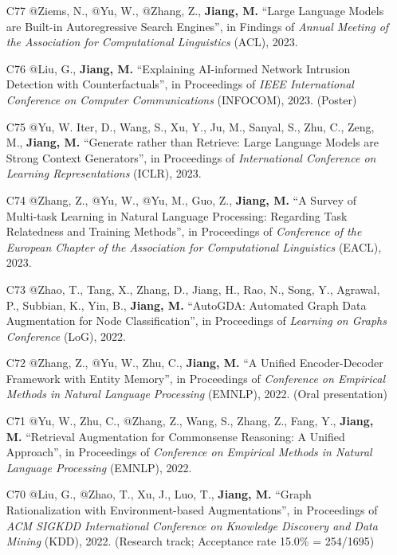 \documentclass[10pt]{article}
\newenvironment{myindentpar}[1]%
{\begin{list}{}%
         {\setlength{\leftmargin}{#1}}%
         \item[]%
}
{\end{list}}
\newcounter{list}
\begin{document}
\begin{myindentpar}{0.00cm}
\begin{enumerate}[leftmargin=.5cm]
\item[C77] @Ziems, N., @Yu, W., @Zhang, Z., \textbf{Jiang, M.} ``Large Language Models are Built-in Autoregressive Search Engines'', in Findings of \textit{Annual Meeting of the Association for Computational Linguistics} (ACL), 2023.

\item[C76] @Liu, G., \textbf{Jiang, M.} ``Explaining AI-informed Network Intrusion Detection with Counterfactuals'', in Proceedings of \textit{IEEE International Conference on Computer Communications} (INFOCOM), 2023. (Poster)
		
\item[C75] @Yu, W. Iter, D., Wang, S., Xu, Y., Ju, M., Sanyal, S., Zhu, C., Zeng, M., \textbf{Jiang, M.} ``Generate rather than Retrieve: Large Language Models are Strong Context Generators'', in Proceedings of \textit{International Conference on Learning Representations} (ICLR), 2023.

\item[C74] @Zhang, Z., @Yu, W., @Yu, M., Guo, Z., \textbf{Jiang, M.} ``A Survey of Multi-task Learning in Natural Language Processing: Regarding Task Relatedness and Training Methods'', in Proceedings of \textit{Conference of the European Chapter of the Association for Computational Linguistics} (EACL), 2023.

\item[C73] @Zhao, T., Tang, X., Zhang, D., Jiang, H., Rao, N., Song, Y., Agrawal, P., Subbian, K., Yin, B., \textbf{Jiang, M.} ``AutoGDA: Automated Graph Data Augmentation for Node Classification'', in Proceedings of \textit{Learning on Graphs Conference} (LoG), 2022.

\item[C72] @Zhang, Z., @Yu, W., Zhu, C., \textbf{Jiang, M.} ``A Unified Encoder-Decoder Framework with Entity Memory'', in Proceedings of \textit{Conference on Empirical Methods in Natural Language Processing} (EMNLP), 2022. (Oral presentation)

\item[C71] @Yu, W., Zhu, C., @Zhang, Z., Wang, S., Zhang, Z., Fang, Y., \textbf{Jiang, M.} ``Retrieval Augmentation for Commonsense Reasoning: A Unified Approach'', in Proceedings of \textit{Conference on Empirical Methods in Natural Language Processing} (EMNLP), 2022.

\item[C70] @Liu, G., @Zhao, T., Xu, J., Luo, T., \textbf{Jiang, M.} ``Graph Rationalization with Environment-based Augmentations'', in Proceedings of \textit{ACM SIGKDD International Conference on Knowledge Discovery and Data Mining} (KDD), 2022. (Research track; Acceptance rate 15.0\% = 254/1695)


\end{enumerate}
\end{myindentpar}
\end{document}
